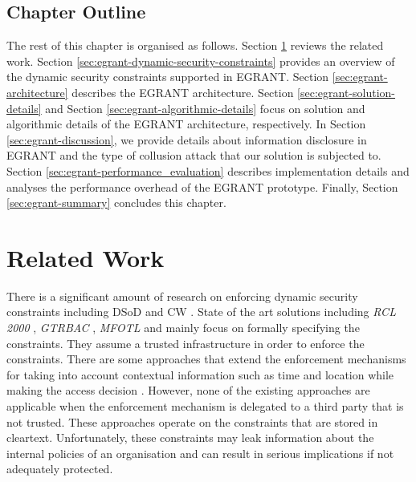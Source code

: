 \documentclass[epsfig,a4paper,11pt,titlepage]{book}
\numberwithin{algorithm}{chapter}
\begin{document}
\subsection{Chapter Outline}
The rest of this chapter is organised as follows. 
Section \ref{sec:egrant-related_work} reviews the related work. 
Section \ref{sec:egrant-dynamic-security-constraints} provides an overview of the dynamic security constraints supported in \gls{EGRANT}. 
Section \ref{sec:egrant-architecture} describes the \gls{EGRANT} architecture. 
Section \ref{sec:egrant-solution-details} and Section \ref{sec:egrant-algorithmic-details} focus on solution and algorithmic details of the \gls{EGRANT} architecture, respectively. 
In Section \ref{sec:egrant-discussion}, we provide details about information disclosure in \gls{EGRANT} and the type of collusion attack that our solution is subjected to.
Section \ref{sec:egrant-performance_evaluation} describes implementation details and analyses the performance overhead of the \gls{EGRANT} prototype. 
Finally, Section \ref{sec:egrant-summary} concludes this chapter.


\section{Related Work}
\label{sec:egrant-related_work}

There is a significant amount of research on enforcing dynamic security constraints including \gls{DSoD} \cite{vanTilborg:2011:DSoD, Kong:2007, Ahn:1999, Sandhu:1996, Sandhu:1990, Nash:1990} and \gls{CW} \cite{Vimercati:2011:CW, Brewer:1989}. State of the art solutions including \emph{RCL 2000} \cite{Ahn:2000}, \emph{GTRBAC} \cite{Joshi:2005}, \emph{MFOTL} \cite{Basin:2010} and \cite{Armando:2012, Crampton:2009, Crampton:2003, Gligor:1998} mainly focus on formally specifying the constraints. They assume a trusted infrastructure in order to enforce the constraints. There are some approaches that extend the enforcement mechanisms for taking into account contextual information such as time and location while making the access decision \cite{Joshi:2008, Kim:2007, Joshi:2005, Strembeck:2004}. However, none of the existing approaches are applicable when the enforcement mechanism is delegated to a third party that is not trusted. These approaches operate on the constraints that are stored in cleartext. Unfortunately, these constraints may leak information about the internal policies of an organisation and can result in serious implications if not adequately protected.
\end{document}
